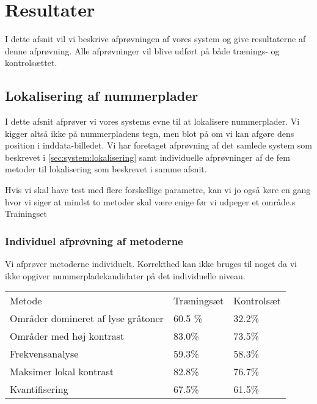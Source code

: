 \section{Resultater}
\label{sec:resultater}

I dette afsnit vil vi beskrive afprøvningen af vores system og give resultaterne af denne afprøvning. Alle afprøvninger vil blive udført på både trænings- og kontrolsættet.


\subsection{Lokalisering af nummerplader}
I dette afsnit afprøver vi vores systems evne til at lokalisere nummerplader. Vi kigger altså ikke på nummerpladens tegn, men blot på om vi kan afgøre dens position i inddata-billedet. Vi har foretaget afprøvning af det samlede system som beskrevet i \vref{sec:system:lokalisering} samt individuelle afprøvninger af de fem metoder til lokalisering som beskrevet i samme afsnit.

Hvis vi skal have test med flere forskellige parametre, kan vi jo også køre en gang hvor vi siger at mindst to metoder skal være enige før vi udpeger et område.s
Trainingset


\subsubsection{Individuel afprøvning af metoderne}
Vi afprøver metoderne individuelt. Korrekthed kan ikke bruges til noget da vi ikke opgiver nummerpladekandidater på det individuelle niveau.
\begin{center}
\begin{tabular}{|l|l|l|}
\hline
\rowcolor[gray]{0.9} \multicolumn{3}{|>{\columncolor[gray]{0.9}}c|}{\textbf{..}} \\ \hline
Metode & Træningsæt & Kontrolsæt\\ \hline
Områder domineret af lyse gråtoner &  60.5 \% & 32.2\%\\ \hline
Områder med høj kontrast & 83.0\% & 73.5\%\\ \hline
Frekvensanalyse &  59.3\% & 58.3\%\\ \hline
Maksimer lokal kontrast &  82.8\% & 76.7\%\\ \hline
Kvantifisering &  67.5\% & 61.5\%\\
\hline
\end{tabular}
\end{center}


